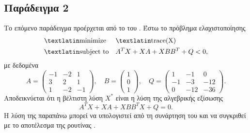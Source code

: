 \subsection{Παράδειγμα 2}
Το επόμενο παράδειγμα προέρχεται από το  του 
\cite{gahinet1994lmi}. Έστω το πρόβλημα ελαχιστοποίησης
\begin{equation*}
    \begin{aligned}
        & \text{\tl{minimize}} & & \text{\tl{trace(X)}} \\
        & \text{\tl{subject to}} & & A^TX + XA + XBB^T + Q < 0,
    \end{aligned}
\end{equation*}
με δεδομένα
\begin{equation*}
    A = \begin{pmatrix}
        -1 & -2 & 1 \\
        3 & 2 & 1 \\
        1 & -2 & -1
    \end{pmatrix},\quad
    B = \begin{pmatrix}
        1 \\
        0 \\
        1
    \end{pmatrix},\quad
    Q = \begin{pmatrix}
        1 & -1 & 0 \\
        -1 & -3 & -12 \\
        0 & -12 & -36
    \end{pmatrix}.
\end{equation*}
Αποδεικνύεται ότι η βέλτιστη λύση \(X^*\) είναι η λύση της αλγεβρικής εξίσωσης
\begin{equation*}
    A^TX + XA + XBB^TX + Q = 0.
\end{equation*}
Η λύση της παραπάνω μπορεί να υπολογιστεί από τη συνάρτηση  του
 και να συγκριθεί με το αποτέλεσμα της  ρουτίνας
.

